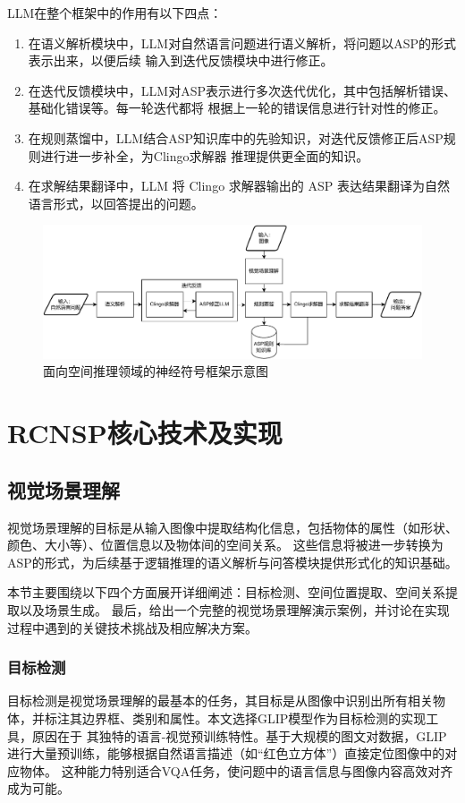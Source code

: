 LLM在整个框架中的作用有以下四点：
\begin{enumerate}[nosep]
    \item 在语义解析模块中，LLM对自然语言问题进行语义解析，将问题以ASP的形式表示出来，以便后续
输入到迭代反馈模块中进行修正。
    \item 在迭代反馈模块中，LLM对ASP表示进行多次迭代优化，其中包括解析错误、基础化错误等。每一轮迭代都将
根据上一轮的错误信息进行针对性的修正。
    \item 在规则蒸馏中，LLM结合ASP知识库中的先验知识，对迭代反馈修正后ASP规则进行进一步补全，为Clingo求解器
推理提供更全面的知识。
    \item 在求解结果翻译中，LLM 将 Clingo 求解器输出的 ASP 表达结果翻译为自然语言形式，以回答提出的问题。
\end{enumerate}
\begin{figure}
    \centering
    \includegraphics[width=\textwidth]{figures/pipeline-crop.pdf}
    \caption{面向空间推理领域的神经符号框架示意图}
    \label{fig:pipeline}
\end{figure}
\section{RCNSP核心技术及实现}
\subsection{视觉场景理解}
视觉场景理解的目标是从输入图像中提取结构化信息，包括物体的属性（如形状、颜色、大小等）、位置信息以及物体间的空间关系。
这些信息将被进一步转换为ASP的形式，为后续基于逻辑推理的语义解析与问答模块提供形式化的知识基础。

本节主要围绕以下四个方面展开详细阐述：目标检测、空间位置提取、空间关系提取以及场景生成。
最后，给出一个完整的视觉场景理解演示案例，并讨论在实现过程中遇到的关键技术挑战及相应解决方案。
\subsubsection{目标检测}
目标检测是视觉场景理解的最基本的任务，其目标是从图像中识别出所有相关物体，并标注其边界框、类别和属性。本文选择GLIP模型作为目标检测的实现工具，原因在于
其独特的语言-视觉预训练特性。基于大规模的图文对数据，GLIP进行大量预训练，能够根据自然语言描述（如“红色立方体”）直接定位图像中的对应物体。
这种能力特别适合VQA任务，使问题中的语言信息与图像内容高效对齐成为可能。

